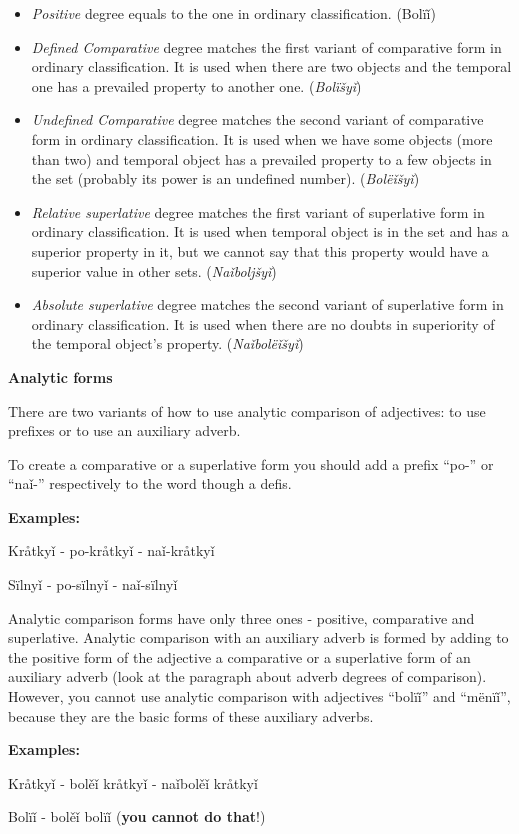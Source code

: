 \begin{itemize}
	\item \textit{Positive} degree equals to the one in ordinary classification. (Bolïǐ)

	\item \textit{Defined Comparative} degree matches the first variant of comparative form in ordinary classification. It is used when there are two objects and the temporal one has a prevailed property to another one. (\textit{Bolïšyǐ})

	\item \textit{Undefined Comparative} degree matches the second variant of comparative form in ordinary classification. It is used when we have some objects (more than two) and temporal object has a prevailed property to a few objects in the set (probably its power is an undefined number). (\textit{Bolëǐšyǐ})

	\item \textit{Relative superlative} degree matches the first variant of superlative form in ordinary classification. It is used when temporal object is in the set and has a superior property in it, but we cannot say that this property would have a superior value in other sets. (\textit{Naǐboljšyǐ})

	\item \textit{Absolute superlative} degree matches the second variant of superlative form in ordinary classification. It is used when there are no doubts in superiority of the temporal object’s property. (\textit{Naǐbolëǐšyǐ})
\end{itemize}

\textbf{Analytic forms}

There are two variants of how to use analytic comparison of adjectives: to use prefixes or to use an auxiliary adverb.

To create a comparative or a superlative form you should add a prefix “po-” or “naǐ-” respectively to the word though a defis.

\textbf{Examples:}

Kråtkyǐ - po-kråtkyǐ - naǐ-kråtkyǐ

Sïlnyǐ - po-sïlnyǐ - naǐ-sïlnyǐ

Analytic comparison forms have only three ones - positive, comparative and superlative. Analytic comparison with an auxiliary adverb is formed by adding to the positive form of the adjective a comparative or a superlative form of an auxiliary adverb (look at the paragraph about adverb degrees of comparison). However, you cannot use analytic comparison with adjectives “bolïǐ” and “mënïǐ”, because they are the basic forms of these auxiliary adverbs.

\textbf{Examples:}

Kråtkyǐ - bolěǐ kråtkyǐ - naǐbolěǐ kråtkyǐ

Bolïǐ - bolěǐ bolïǐ (\textbf{you cannot do that}!)
